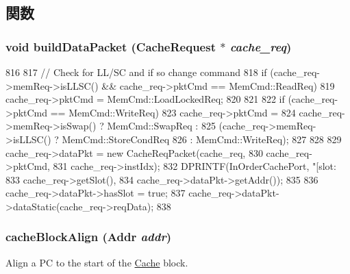 \subsection{関数}
\hypertarget{classCacheUnit_ad661f2bbc47ffa00d06636041132af20}{
\subsubsection[{buildDataPacket}]{\setlength{\rightskip}{0pt plus 5cm}void buildDataPacket ({\bf CacheRequest} $\ast$ {\em cache\_\-req})}}
\label{classCacheUnit_ad661f2bbc47ffa00d06636041132af20}



\begin{DoxyCode}
816 {
817     // Check for LL/SC and if so change command
818     if (cache_req->memReq->isLLSC() && cache_req->pktCmd == MemCmd::ReadReq) {
819         cache_req->pktCmd = MemCmd::LoadLockedReq;
820     }
821 
822     if (cache_req->pktCmd == MemCmd::WriteReq) {
823         cache_req->pktCmd =
824             cache_req->memReq->isSwap() ? MemCmd::SwapReq :
825             (cache_req->memReq->isLLSC() ? MemCmd::StoreCondReq 
826              : MemCmd::WriteReq);
827     }
828 
829     cache_req->dataPkt = new CacheReqPacket(cache_req,
830                                             cache_req->pktCmd,
831                                             cache_req->instIdx);
832     DPRINTF(InOrderCachePort, "[slot:%
833             cache_req->getSlot(),
834             cache_req->dataPkt->getAddr());
835 
836     cache_req->dataPkt->hasSlot = true;
837     cache_req->dataPkt->dataStatic(cache_req->reqData);
838 }
\end{DoxyCode}
\hypertarget{classCacheUnit_a6a734ac8ee8c7fbe0df3fed5826a52ef}{
\subsubsection[{cacheBlockAlign}]{ cacheBlockAlign ({\bf Addr} {\em addr})}}
\label{classCacheUnit_a6a734ac8ee8c7fbe0df3fed5826a52ef}
Align a PC to the start of the \hyperlink{classCache}{Cache} block. 


